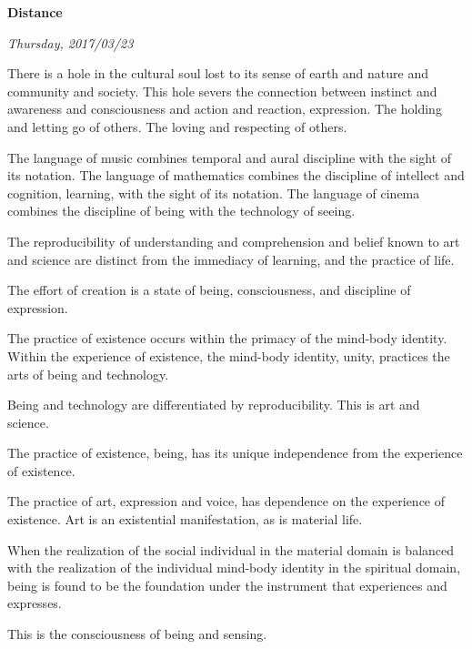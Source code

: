 

\centerline{\bf Distance}
\centerline{\it Thursday, 2017/03/23}



\vfill
\break


There is a hole in the cultural soul lost to its sense of earth and
nature and community and society.  This hole severs the connection
between instinct and awareness and consciousness and action and
reaction, expression.  The holding and letting go of others.  The
loving and respecting of others.  


\vfill
\break


The language of music combines temporal and aural discipline with the
sight of its notation.  The language of mathematics combines the
discipline of intellect and cognition, learning, with the sight of its
notation.  The language of cinema combines the discipline of being
with the technology of seeing.  

The reproducibility of understanding and comprehension and belief
known to art and science are distinct from the immediacy of learning,
and the practice of life.

The effort of creation is a state of being, consciousness, and
discipline of expression.

The practice of existence occurs within the primacy of the mind-body
identity.  Within the experience of existence, the mind-body identity,
unity, practices the arts of being and technology.

Being and technology are differentiated by reproducibility.  This is
art and science.




\vfill
\break


The practice of existence, being, has its unique independence from the
experience of existence.  

The practice of art, expression and voice, has dependence on the
experience of existence.  Art is an existential manifestation, as is
material life.

When the realization of the social individual in the material domain
is balanced with the realization of the individual mind-body identity
in the spiritual domain, being is found to be the foundation under the
instrument that experiences and expresses.  

This is the consciousness of being and sensing.



